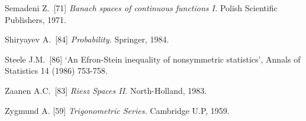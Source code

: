 {Semadeni Z.\ [71] {\it Banach spaces of continuous functions I.}
Polish Scientific Publishers, 1971.  \cmmnt{[\S253 {\it catatan}.]}

Shiryayev A.\ [84] {\it Probability.} Springer, 1984. \cmmnt{[285N.]}

Steele J.M.\ [86] `An Efron-Stein inequality of nonsymmetric statistics',
Annals of Statistics 14 (1986) 753-758.
\cmmnt{[274Ya.]}

\medskip%

Zaanen A.C.\ [83] {\it Riesz Spaces II.} North-Holland, 1983.
\cmmnt{[241F.]}

Zygmund A. [59] {\it Trigonometric Series.}   Cambridge U.P, 1959.

\frnewpage

}%
